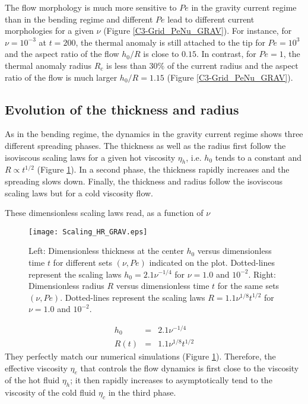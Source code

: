 The flow  morphology is  much more  sensitive to  $Pe$ in  the gravity
current regime than  in the bending regime and different  $Pe$ lead to
different   current   morphologies   for   a   given   $\nu$   (Figure
\ref{C3-Grid_PeNu_GRAV}).  For instance, for $\nu=10^{-3}$ at $t=200$,
the thermal anomaly is  still attached to the tip for  $Pe = 10^3$ and
the aspect ratio of the flow $h_0/R$ is close to $0.15$.  In contrast,
for $Pe=1$,  the thermal anomaly radius  $R_c$ is less than  $30\%$ of
the current  radius and the  aspect ratio of  the flow is  much larger
$h_0/R = 1.15$ (Figure \ref{C3-Grid_PeNu_GRAV}).

\subsection{Evolution of the thickness and radius}
\label{C3-sec:evol-thickn-radi-g}
  
As in the  bending regime, the dynamics in the  gravity current regime
shows three different spreading phases.   The thickness as well as the
radius  first follow  the  isoviscous  scaling laws  for  a given  hot
viscosity   $\eta_h$,   i.e.    $h_0$   tends  to   a   constant   and
$R\propto  t^{1/2}$ (Figure  \ref{C3-Scaling_HR_GRAV}).   In a  second
phase, the thickness  rapidly increases and the  spreading slows down.
Finally, the thickness  and radius follow the  isoviscous scaling laws
but for a cold viscosity flow.

These dimensionless scaling laws read, as a function of $\nu$
\begin{figure}
  \begin{center}
    \graphicspath{ {/Users/thorey/Documents/These/Projet/Refroidissement/Skin_Model/Figure/JFM_V13/} }
    \texttt{[image: Scaling\_HR\_GRAV.eps]}
    \caption{Left: Dimensionless thickness at  the center $h_0$ versus
      dimensionless time  $t$ for different sets  $(\nu,Pe)$ indicated
      on   the  plot.    Dotted-lines  represent   the  scaling   laws
      $h_0=  2.1\nu^{-1/4}$ for  $\nu  = 1.0$  and $10^{-2}$.   Right:
      Dimensionless radius  $R$ versus dimensionless time  $t$ for the
      same sets  $(\nu,Pe)$.  Dotted-lines represent the  scaling laws
      $R= 1.1\nu^{1/8}t^{1/2}$ for $\nu = 1.0$ and $10^{-2}$.}
    \label{C3-Scaling_HR_GRAV}
  \end{center}
\end{figure}

\begin{eqnarray}
  h_0 &=& 2.1\nu^{-1/4}\label{C3-scaling-H-gravi-2}\\
  R(t) &=& 1.1\nu^{1/8} t^{1/2}\label{C3-scaling-R-gravi-2}
\end{eqnarray}
They    perfectly   match    our    numerical   simulations    (Figure
\ref{C3-Scaling_HR_GRAV}).    Therefore,   the   effective   viscosity
$\eta_e$  that  controls the  flow  dynamics  is  first close  to  the
viscosity  of the  hot fluid  $\eta_h$; it  then rapidly  increases to
asymptotically tend to the viscosity of the cold fluid $\eta_c$ in the
third phase.

